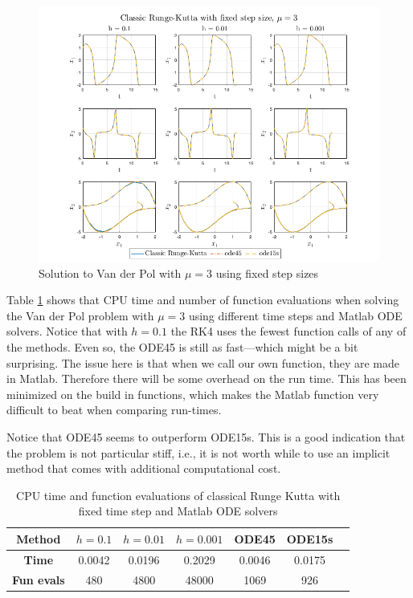 \begin{figure}[H]
    \centering
    \includegraphics[width=\textwidth]{graphics/opg5/mu3_fixed.png}
    \caption{Solution to Van der Pol with $\mu = 3$ using fixed step sizes}
    \label{fig5:fixed_mu3}
\end{figure}

Table \ref{tab5:mu3_fixed} shows that CPU time and number of function evaluations when solving the Van der Pol problem with $\mu = 3$ using different time steps and Matlab ODE solvers. Notice that with $h=0.1$ the RK4 uses the fewest function calls of any of the methods. Even so, the ODE45 is still as fast---which might be a bit surprising. The issue here is that when we call our own function, they are made in Matlab. Therefore there will be some overhead on the run time. This has been minimized on the build in functions, which makes the Matlab function very difficult to beat when comparing run-times. 

Notice that ODE45 seems to outperform ODE15s. This is a good indication that the problem is not particular stiff, i.e., it is not worth while to use an implicit method that comes with additional computational cost. 

\begin{table}[H]
    \centering
    \caption{CPU time and function evaluations of classical Runge Kutta with fixed time step and Matlab ODE solvers}
    \begin{tabular}{|c||c|c|c|c|c|c|} \hline
         \textbf{Method}    & $h=0.1$&   $h=0.01$ & $h=0.001$ & ODE45 & ODE15s     \\ \hline \hline 
         \textbf{Time}      & 0.0042 &   0.0196 &   0.2029 &  0.0046 & 0.0175   \\ \hline
         \textbf{Fun evals} & 480     &   4800   &    48000 & 1069 & 926  \\ \hline
    \end{tabular}
    \label{tab5:mu3_fixed}
\end{table}



